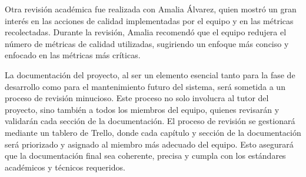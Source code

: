 Otra revisión académica fue realizada con Amalia Álvarez, quien mostró un gran interés en las acciones de calidad implementadas por el equipo y en las 
métricas recolectadas. Durante la revisión, Amalia recomendó que el equipo redujera el número de métricas de calidad utilizadas, sugiriendo un enfoque 
más conciso y enfocado en las métricas más críticas.

La documentación del proyecto, al ser un elemento esencial tanto para la fase de desarrollo como para el mantenimiento futuro del sistema, será sometida 
a un proceso de revisión minucioso. Este proceso no solo involucra al tutor del proyecto, sino también a todos los miembros del equipo, quienes revisarán 
y validarán cada sección de la documentación. El proceso de revisión se gestionará mediante un tablero de Trello, donde cada capítulo y sección de la 
documentación será priorizado y asignado al miembro más adecuado del equipo. Esto asegurará que la documentación final sea coherente, precisa y cumpla 
con los estándares académicos y técnicos requeridos.